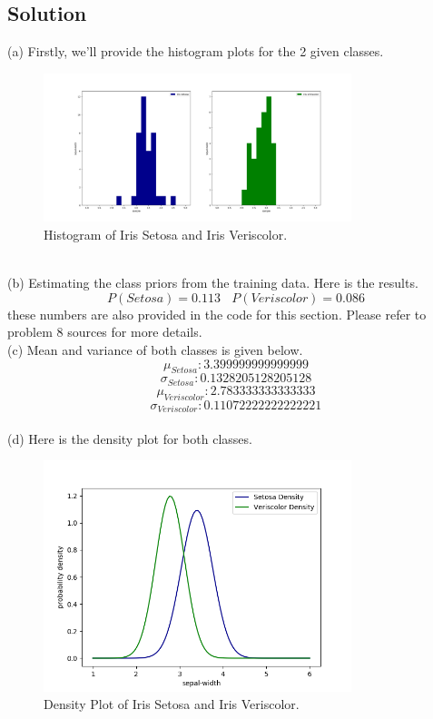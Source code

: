 \documentclass[12pt]{article}
\numberwithin{equation}{section}
\numberwithin{table}{section}
\numberwithin{figure}{section}
\begin{document}
\subsection*{Solution}
(a) Firstly, we'll provide the histogram plots for the 2 given classes.
\begin{figure}[!h]\centering
	\includegraphics[width=0.8\textwidth]{8_1.png}
	\caption{Histogram of Iris Setosa and Iris Veriscolor.}
	\label{pl8}
\end{figure}\\
(b) Estimating the class priors from the training data. Here is the results.
$$
	P(Setosa) = 0.113 \ \ \ \ P(Veriscolor) = 0.086
$$ 
these numbers are also provided in the code for this section. Please refer to problem 8 sources for more details.\\
(c) Mean and variance of both classes is given below.
$$
	\mu_{Setosa}:  3.399999999999999
$$
$$
	\sigma_{Setosa}:  0.1328205128205128
$$
$$
	\mu_{Veriscolor}:  2.783333333333333
$$
$$
	\sigma_{Veriscolor}:  0.11072222222222221
$$\\
(d) Here is the density plot for both classes.
\begin{figure}[!h]\centering
	\includegraphics[width=0.8\textwidth]{8_3.png}
	\caption{Density Plot of Iris Setosa and Iris Veriscolor.}
	\label{pl8_3}
\end{figure}
\end{document}
